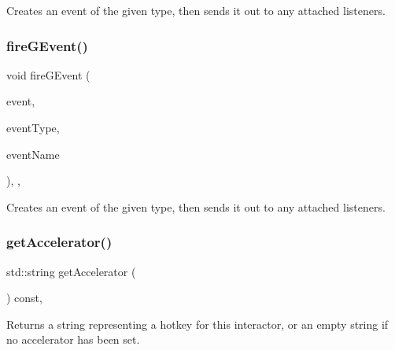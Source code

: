 Creates an event of the given type, then sends it out to any attached listeners. 

\mbox{\label{classsgl_1_1GObservable_a2a70a7d7435ff0c3b80bb4d70da19e0d}} 
\subsubsection{\texorpdfstring{fire\+G\+Event()}{fireGEvent()}\hspace{0.1cm}{\footnotesize\ttfamily [8/8]}}
{\footnotesize\ttfamily void fire\+G\+Event (\begin{DoxyParamCaption}\item[{Q\+Window\+State\+Change\+Event $\ast$}]{event,  }\item[{\mbox{\hyperlink{namespacesgl_a2628ea8d12e8b2563c32f05dc7fff6fa}{Event\+Type}}}]{event\+Type,  }\item[{const std\+::string \&}]{event\+Name }\end{DoxyParamCaption})\hspace{0.3cm}{\ttfamily [protected]}, {\ttfamily [virtual]}, {\ttfamily [inherited]}}



Creates an event of the given type, then sends it out to any attached listeners. 

\mbox{\label{classsgl_1_1GInteractor_a69f8d23ed8f207fbecad99960776e942}} 
\subsubsection{\texorpdfstring{get\+Accelerator()}{getAccelerator()}}
{\footnotesize\ttfamily std\+::string get\+Accelerator (\begin{DoxyParamCaption}{ }\end{DoxyParamCaption}) const\hspace{0.3cm}{\ttfamily [virtual]}, {\ttfamily [inherited]}}



Returns a string representing a hotkey for this interactor, or an empty string if no accelerator has been set. 

